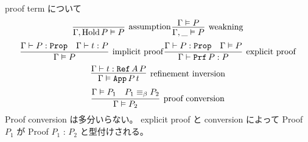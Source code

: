\begin{itembox}[l]{proof term について}
  \[
    \infer[\text{assumption}]{\Gamma , \text{Hold} \, P \vDash P}{}\,
    \infer[\text{weakning}]{\Gamma , \_ \vDash P}{\Gamma \vDash P}
  \]
  \[
    \infer[\text{implicit proof}]{\Gamma \vDash P}{\Gamma \vdash P : \texttt{Prop} & \Gamma \vdash t : P} \,
    \infer[\text{explicit proof}]{\Gamma \vdash \texttt{Prf} \, P : P}{\Gamma \vdash P : \texttt{Prop} &\Gamma \vDash P} \]
  \[
    \infer[\text{refinement inversion}]{\Gamma \vDash \texttt{App} \, P \, t}{\Gamma \vdash t : \texttt{Ref} \, A \, P}\]
  \[
    \infer[\text{proof conversion}]{\Gamma \vDash P_2}{\Gamma \vDash P_1 & P_1 \equiv_{\beta} P_2} \]
  Proof conversion は多分いらない。
  explicit proof と conversion によって Proof \(P_1\) が Proof \(P_1\) : \(P_2\) と型付けされる。
\end{itembox}